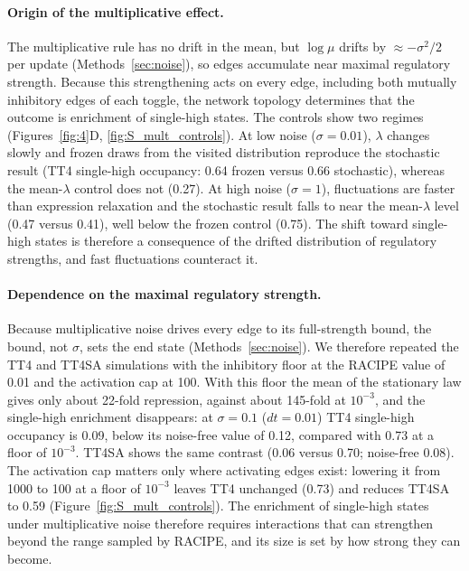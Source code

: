\documentclass[11pt]{article}
\providecommand{\DIFaddtex}[1]{{\protect\color{red}#1}} %
\providecommand{\DIFaddbegin}{} %
\providecommand{\DIFadd}[1]{\texorpdfstring{\DIFaddtex{#1}}{#1}} %
\providecommand{\DIFaddincludegraphics}[2][]{\DIFOincludegraphics[#1]{#2}} %
\DeclareRobustCommand{\DIFaddbegin}{\DIFOaddbegin \let\includegraphics\DIFaddincludegraphics} %
\begin{document}
\DIFaddbegin \paragraph{\DIFadd{Origin of the multiplicative effect.}} \DIFadd{The multiplicative rule has no drift in the mean, but $\log\mu$ drifts by $\approx -\sigma^2/2$ per update (Methods~\ref{sec:noise}), so edges accumulate near maximal regulatory strength. Because this strengthening acts on every edge, including both mutually inhibitory edges of each toggle, the network topology determines that the outcome is enrichment of single-high states. The controls show two regimes (Figures~\ref{fig:4}D, \ref{fig:S_mult_controls}). At low noise ($\sigma = 0.01$), $\lambda$ changes slowly and frozen draws from the visited distribution reproduce the stochastic result (TT4 single-high occupancy: 0.64 frozen versus 0.66 stochastic), whereas the mean-$\lambda$ control does not (0.27). At high noise ($\sigma = 1$), fluctuations are faster than expression relaxation and the stochastic result falls to near the mean-$\lambda$ level (0.47 versus 0.41), well below the frozen control (0.75). The shift toward single-high states is therefore a consequence of the drifted distribution of regulatory strengths, and fast fluctuations counteract it.
}

\paragraph{\DIFadd{Dependence on the maximal regulatory strength.}} \label{sec:mult_floor} \DIFadd{Because multiplicative noise drives every edge to its full-strength bound, the bound, not $\sigma$, sets the end state (Methods~\ref{sec:noise}). We therefore repeated the TT4 and TT4SA simulations with the inhibitory floor at the RACIPE value of 0.01 and the activation cap at 100. With this floor the mean of the stationary law gives only about 22-fold repression, against about 145-fold at $10^{-3}$, and the single-high enrichment disappears: at $\sigma = 0.1$ ($dt = 0.01$) TT4 single-high occupancy is 0.09, below its noise-free value of 0.12, compared with 0.73 at a floor of $10^{-3}$. TT4SA shows the same contrast (0.06 versus 0.70; noise-free 0.08). The activation cap matters only where activating edges exist: lowering it from 1000 to 100 at a floor of $10^{-3}$ leaves TT4 unchanged (0.73) and reduces TT4SA to 0.59 (Figure~\ref{fig:S_mult_controls}). The enrichment of single-high states under multiplicative noise therefore requires interactions that can strengthen beyond the range sampled by RACIPE, and its size is set by how strong they can become.
}
\end{document}
